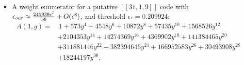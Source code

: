 \documentclass[11pt]{article}
\begin{document}
\begin{itemize}
    \item A weight enumerator for a putative $[[31,1,9]]$ code with $\epsilon_{\rm out} \approx  \frac{245939 \epsilon ^7}{59} +O(\epsilon^8)$, and threshold $\epsilon_*=0.209924$:
\begin{equation}
\begin{aligned}
    A(1, y) = & \, 1 + 573y^4 + 4548y^6 + 10872y^8 + 57435y^{10} + 1568526y^{12} \\
              & + 2104353y^{14} + 14274369y^{16} + 4369902y^{18} + 141384465y^{20} \\
              & + 311881446y^{22} + 382394646y^{24} + 166952583y^{26} + 30493908y^{28} \\
              & + 18244197y^{30}.
\end{aligned}
\end{equation}
\end{itemize}




\end{document}
